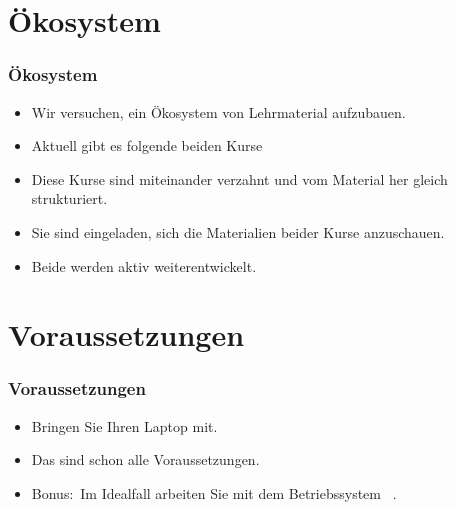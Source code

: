 \documentclass[aspectratio=169,mathserif,notheorems]{beamer}%
\begin{document}
\section{Ökosystem}%
%
\begin{frame}%
\frametitle{Ökosystem}%
\begin{itemize}%
\item Wir versuchen, ein Ökosystem von Lehrmaterial aufzubauen.%
\item<2-> Aktuell gibt es folgende beiden Kurse%
\item<5-> Diese Kurse sind miteinander verzahnt und vom Material her gleich strukturiert.%
\item<6-> Sie sind eingeladen, sich die Materialien beider Kurse anzuschauen.%
\item<7-> Beide werden aktiv weiterentwickelt.%
\end{itemize}%
\end{frame}%
%
%
\section{Voraussetzungen}%
%
\begin{frame}%
\frametitle{Voraussetzungen}%
\begin{itemize}%
\item Bringen Sie Ihren Laptop mit.%
\item<7-> Das sind schon alle Voraussetzungen.%
\item<8-> Bonus:~Im Idealfall arbeiten Sie mit dem Betriebssystem \ubuntu\ \linux{}.%
\end{itemize}%
\end{frame}%
%
%
\end{document}
